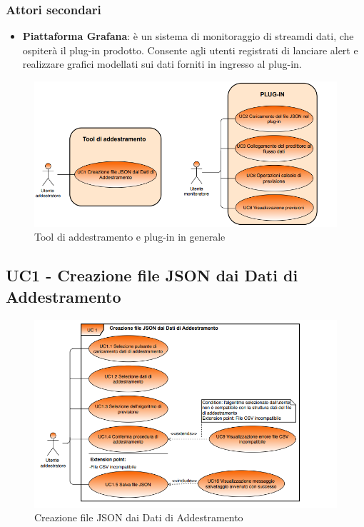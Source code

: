 	\subsubsection{Attori secondari}
	\begin{itemize}
		\item\textbf{Piattaforma Grafana}: è un sistema di monitoraggio di stream\glo di dati, che ospiterà il plug-in prodotto. Consente agli utenti registrati di lanciare alert e realizzare grafici modellati sui dati forniti in ingresso al plug-in.
 	\end{itemize}

\begin{figure}[H]
		\centering
		\includegraphics[scale=0.80]{../Analisi_dei_requisiti/img/Diagrammi_UML/tool_e_plug-in.png}
		\caption{Tool di addestramento e plug-in in generale}
	\end{figure}

	\label{par:UC1}
	\subsection{UC1 - Creazione file JSON dai Dati di Addestramento}

	\begin{figure}[H]
		\centering
		\includegraphics[scale=0.70]{../Analisi_dei_requisiti/img/Diagrammi_UML/UC1_tool_di_addestramento.png}
		\caption{Creazione file JSON dai Dati di Addestramento}
	\end{figure}	

